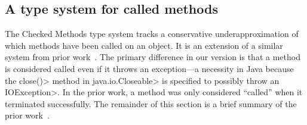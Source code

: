 


\subsection{A type system for called methods}
\label{sec:called-methods}


The Checked Methods type system tracks a conservative underapproximation of which methods have been called on an object.
It is an extension of a similar system
from prior work~\cite{KelloggRSSE2020}.  The primary difference in our
version is that a method is considered called even if it throws an
exception---a necessity in Java because the \<close()> method
in \<java.io.Closeable> is specified to possibly throw an \<IOException>.
In the prior work, a method was only considered ``called'' when it terminated
successfully.
The remainder of this section is a brief summary
of the prior work~\cite{KelloggRSSE2020}.


